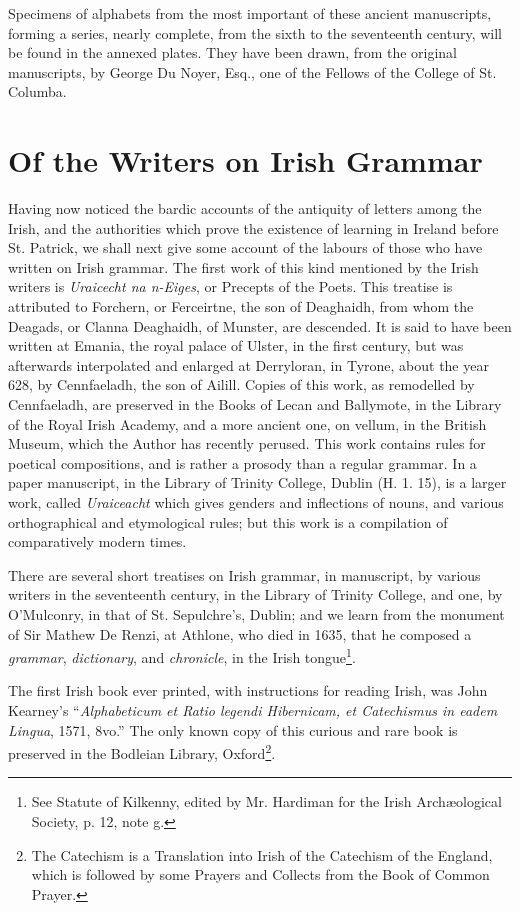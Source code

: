 \documentclass[11pt,oneside]{memoir}
\begin{document}
Specimens of alphabets from the most important of these ancient manuscripts, forming a series, nearly complete, from the sixth to the seventeenth century, will be found in the annexed plates.
They have been drawn, from the original manuscripts, by George Du Noyer, Esq., one of the Fellows of the College of St. Columba.

\section{Of the Writers on Irish Grammar}
Having now noticed the bardic accounts of the antiquity of letters among the Irish, and the authorities which prove the existence of learning in Ireland before St. Patrick, we shall next give some account of the labours of those who have written on Irish grammar.
The first work of this kind mentioned by the Irish writers is \textit{Uraicecht na n-Eiges}, or Precepts of the Poets.
This treatise is attributed to Forchern, or Ferceirtne, the son of Deaghaidh, from whom the Deagads, or Clanna Deaghaidh, of Munster, are descended.
It is said to have been written at Emania, the royal palace of Ulster, in the first century, but was afterwards interpolated and enlarged at Derryloran, in Tyrone, about the year 628, by Cennfaeladh, the son of Ailill.
Copies of this work, as remodelled by Cennfaeladh, are preserved in the Books of Lecan and Ballymote, in the Library of the Royal Irish Academy, and a more ancient one, on vellum, in the British Museum, which the Author has recently perused.
This work contains rules for poetical compositions, and is rather a prosody than a regular grammar.
In a paper manuscript, in the Library of Trinity College, Dublin (H. 1. 15), is a larger work, called \textit{Uraiceacht} which gives genders and inflections of nouns, and various orthographical and etymological rules; but this work is a compilation of comparatively modern times. 

There are several short treatises on Irish grammar, in manuscript, by various writers in the seventeenth century, in the Library of Trinity College, and one, by O'Mulconry, in that of St. Sepulchre's, Dublin;
and we learn from the monument of Sir Mathew De Renzi, at Athlone, who died in 1635, that he composed a \textit{grammar}, \textit{dictionary}, and \textit{chronicle}, in the Irish tongue\footnote{
    See Statute of Kilkenny, edited by Mr. Hardiman for the Irish Archæological Society, p. 12, note g.
}. 

The first Irish book ever printed, with instructions for reading Irish, was John Kearney's ``\textit{Alphabeticum et Ratio legendi Hibernicam, et Catechismus in eadem Lingua}, 1571, 8vo.''
The only known copy of this curious and rare book is preserved in the Bodleian Library, Oxford\footnote{
    The Catechism is a Translation into Irish of the Catechism of the England, which is followed by some Prayers and Collects from the Book of Common Prayer.
}. 
\end{document}
